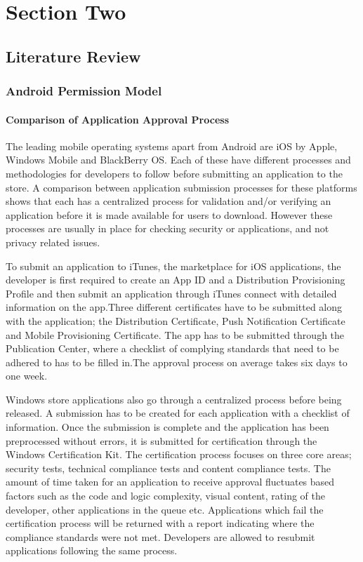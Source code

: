 \chapter{Section Two} \label{cha:litrev}
\section{Literature Review}
\subsection{Android Permission Model}
\subsubsection{Comparison of Application Approval Process}

The leading mobile operating systems apart from Android are iOS by Apple, Windows Mobile and BlackBerry OS. Each of these have different processes and methodologies for developers to follow before submitting an application to the store. A comparison between application submission processes for these platforms shows that each has a centralized process for validation and/or verifying an application before it is made available for users to download. However these processes are usually in place for checking security or applications, and not privacy related issues. 
\smallskip

To submit an application to iTunes, the marketplace for iOS applications, the developer is first required to create an App ID and a Distribution Provisioning Profile and then  submit an application through iTunes connect with detailed information on the app.Three different certificates have to be submitted along with the application; the Distribution Certificate, Push Notification Certificate and Mobile Provisioning Certificate. The app has to be submitted through the Publication Center, where a checklist of complying standards that need to be adhered to has to be filled in.The approval process on average takes six days to one week.\cite{e}
\smallskip

Windows store applications also go through a centralized process before being released. A submission has to be created for each application with a checklist of information. Once the submission is complete and the application has been preprocessed without errors, it is submitted for certification through the Windows Certification Kit. The certification process focuses on three core areas; security tests, technical compliance tests and content compliance tests. The amount of time taken for an application to receive approval fluctuates based factors such as the code and logic complexity, visual content, rating of the developer, other applications in the queue etc. Applications which fail the certification process will be returned with a report indicating where the compliance standards were not met. Developers are allowed to resubmit applications following the same process.\cite{f}
\smallskip

